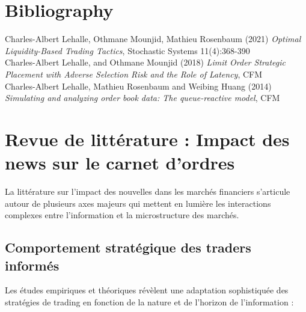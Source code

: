 \documentclass[12pt,a4paper]{article}
\theoremstyle{definition}
\theoremstyle{remark}
\begin{document}
    \section*{Bibliography}

    Charles-Albert Lehalle, Othmane Mounjid, Mathieu Rosenbaum (2021) \textit{Optimal Liquidity-Based Trading Tactics}, Stochastic Systems 11(4):368-390 
    \\
    Charles-Albert Lehalle, and Othmane Mounjid (2018) \textit{Limit Order Strategic Placement
    with Adverse Selection Risk
    and the Role of Latency}, CFM
    \\
    Charles-Albert Lehalle, Mathieu Rosenbaum and Weibing Huang (2014) \textit{Simulating and analyzing order book data: The queue-reactive model}, CFM

    \section{Revue de littérature : Impact des news sur le carnet d'ordres}

    La littérature sur l'impact des nouvelles dans les marchés financiers s'articule autour de plusieurs axes majeurs qui mettent en lumière les interactions complexes entre l'information et la microstructure des marchés.

    \subsection{Comportement stratégique des traders informés}

    Les études empiriques et théoriques révèlent une adaptation sophistiquée des stratégies de trading en fonction de la nature et de l'horizon de l'information :
\end{document}
